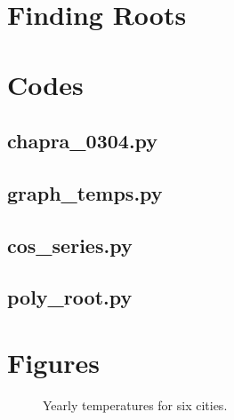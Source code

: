 \documentclass{article}
\begin{document}
\section{Finding Roots}

\pagebreak
\appendix
\section{Codes}

\lstset{style=python103, language=python} 

\subsection{chapra\_0304.py}
%
\clearpage

\subsection{graph\_temps.py}
%
\clearpage

\subsection{cos\_series.py}
%
\clearpage

\subsection{poly\_root.py}
%

\clearpage %

\section{Figures}
\begin{figure}[htb!]
\begin{center}
\caption{Yearly temperatures for six cities.\label{TempGraph}}
\end{center}
\end{figure}
\clearpage
\end{document}
